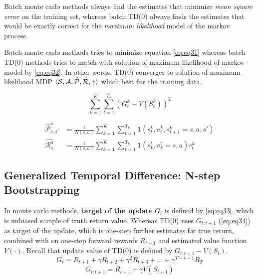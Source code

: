 \documentclass[
	10pt, %
]{article}
\theoremstyle{plain}
\newcommand{\mc}[1]{\mathcal{#1}}
\newcommand{\tb}[1]{\textbf{#1}}
\newcommand{\ti}[1]{\textit{#1}}
\numberwithin{equation}{subsection} %
\begin{document}
Batch monte carlo methods always find the estimates that minimize \ti{mean square error} on the training set, whereas batch TD(0) always finds the estimates that would be exactly correct for the \ti{maximum likelihood} model of the markov process.

Batch monte carlo methods tries to minimize equation \cref{eq:eq31} whereas batch TD(0) methods tries to match with solution of maximum likelihood of markov model by \cref{eq:eq32}. In other words, TD(0) converges to solution of maximum likelihood MDP $\braket{\mc{S,A,\hat{P}, \hat{R}},\gamma}$ which best fits the training data.

\begin{equation} \label{eq:eq31}
    \sum^K_{k=1} \sum^{T_k}_{t=1} \left(G^k_t - V(S^k_t)\right)^2
\end{equation}

\begin{equation} \label{eq:eq32}
    \begin{aligned}
        \hat{\mc{P}}^a_{s,s'} &= \frac{1}{N(s,a)} \sum^K_{k=1} \sum^{T_k}_{t=1}\mathbf{1}(s^k_t,a^k_t,s^k_{t+1} = s, a, s')\\
        \hat{\mc{R}^a_s} &= \frac{1}{N(s,a)} \sum^K_{k=1} \sum^{T_k}_{t=1}\mathbf{1}(s^t_k,a^t_k = s,a)r^k_t
    \end{aligned}
\end{equation}

\subsection{Generalized Temporal Difference: N-step Bootstrapping}
In monte carlo methods, \tb{target of the update} $G_t$ is defined by \cref{eq:eq33}, which is unbiased sample of truth return value. Whereas TD(0) uses $G_{t:t+1}$ (\cref{eq:eq34}) as target of the update, which is one-step further estimates for true return, combined with on one-step forward rewards $R_{t+1}$ and estimated value function $V(\cdot)$. Recall that update value of TD(0) is defined by $G_{t:t+1} - V(S_t)$.
\begin{equation} \label{eq:eq33}
    G_t = R_{t+1} + \gamma R_{t+2} + \gamma^2 R_{t+3} + \dots + \gamma^{T-t-1} R_T
\end{equation}
\begin{equation} \label{eq:eq34}
    G_{t:t+1} = R_{t+1} + \gamma V(S_{t+1})
\end{equation}

\end{document}
